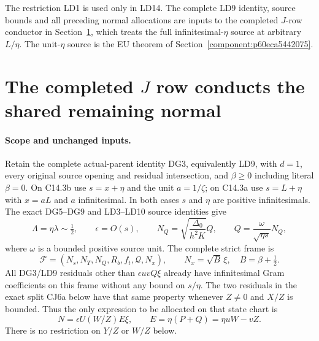 The restriction LD1 is used only in LD14. The complete LD9 identity, source bounds and all preceding normal allocations are inputs to the completed $J$-row conductor in Section~\ref{component:pe3bbfd3a8151}, which treats the full infinitesimal-$\eta$ source at arbitrary $L/\eta$. The unit-$\eta$ source is the EU theorem of Section~\ref{component:p60eca5442075}.


\section{\texorpdfstring{The completed $J$ row conducts the shared remaining normal}{The completed J row conducts the shared remaining normal}}
\label{component:pe3bbfd3a8151}

\label{pe3bbfd3a8151:sec:r18-completed-j}

\paragraph{Scope and unchanged inputs.}
Retain the complete actual-parent identity DG3, equivalently LD9,
with $d=1$, every original source opening and residual intersection,
and $\beta\ge0$ including literal $\beta=0$.  On C14.3b use
$s=x+\eta$ and the unit $a=1/\zeta$; on C14.3a use $s=L+\eta$
with $x=aL$ and $a$ infinitesimal.  In both cases $s$ and $\eta$
are positive infinitesimals.  The exact DG5--DG9 and LD3--LD10 source identities give
\[
 \Lambda=\eta\lambda\sim\tfrac12,\qquad
 \epsilon=O(s),\qquad
 N_Q=\sqrt{\frac{\Delta_0}{h^2K}}Q,
 \qquad
 Q=\frac{\omega}{\sqrt{\eta s}}N_Q,                 \tag{CJ1}
\]
where $\omega$ is a bounded positive source unit.  The complete strict
frame is
\[
 \mathcal F=(N_s,N_T,N_Q,R_b,f_t,\mathcal Q,N_x),
 \qquad N_x=\sqrt B\,\xi,\quad B=\beta+\tfrac12.
                                                               \tag{CJ2}
\]
All DG3/LD9 residuals other than $\epsilon uvQ\xi$ already have
infinitesimal Gram coefficients on this frame without any bound on
$s/\eta$.  The two residuals in the exact split CJ6a below have that same
property whenever $Z\ne0$ and $X/Z$ is bounded.  Thus the only
expression to be allocated on that state chart is
\[
 N=\epsilon U(W/Z)E\xi,
 \qquad E=\eta(P+Q)=\eta uW-vZ.                    \tag{CJ3}
\]
There is no restriction on $Y/Z$ or $W/Z$ below.

